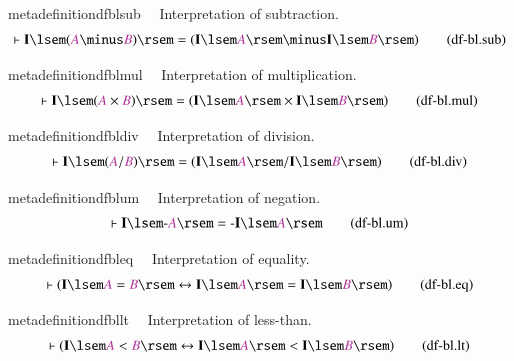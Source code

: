 \begin{restatable}{metadefinition}{dfblsub}~~ Interpretation of subtraction.
\begin{align}
\vdash \mathbf{I} \lsem ( \mc{A} \minus \mc{B} ) \rsem = ( \mathbf{I} \lsem
    \mc{A} \rsem \minus \mathbf{I} \lsem \mc{B} \rsem
    )\label{eq:df-bl.sub}\tag{df-bl.sub}
\end{align}
\end{restatable}

\begin{restatable}{metadefinition}{dfblmul}~~ Interpretation of multiplication.
\begin{align}
\vdash \mathbf{I} \lsem ( \mc{A} \times \mc{B} ) \rsem = ( \mathbf{I} \lsem
    \mc{A} \rsem \times \mathbf{I} \lsem \mc{B} \rsem
    )\label{eq:df-bl.mul}\tag{df-bl.mul}
\end{align}
\end{restatable}

\begin{restatable}{metadefinition}{dfbldiv}~~ Interpretation of division.
\begin{align}
\vdash \mathbf{I} \lsem ( \mc{A} / \mc{B} ) \rsem = ( \mathbf{I} \lsem \mc{A}
    \rsem / \mathbf{I} \lsem \mc{B} \rsem )\label{eq:df-bl.div}\tag{df-bl.div}
\end{align}
\end{restatable}

\begin{restatable}{metadefinition}{dfblum}~~ Interpretation of negation.
\begin{align}
\vdash \mathbf{I} \lsem \textrm{-} \mc{A} \rsem = \textrm{-} \mathbf{I} \lsem
    \mc{A} \rsem\label{eq:df-bl.um}\tag{df-bl.um}
\end{align}
\end{restatable}

\begin{restatable}{metadefinition}{dfbleq}~~ Interpretation of equality.
\begin{align}
\vdash ( \mathbf{I} \lsem \mc{A} = \mc{B} \rsem \leftrightarrow \mathbf{I}
    \lsem \mc{A} \rsem = \mathbf{I} \lsem \mc{B} \rsem
    )\label{eq:df-bl.eq}\tag{df-bl.eq}
\end{align}
\end{restatable}

\begin{restatable}{metadefinition}{dfbllt}~~ Interpretation of less-than.
\begin{align}
\vdash ( \mathbf{I} \lsem \mc{A} < \mc{B} \rsem \leftrightarrow \mathbf{I}
    \lsem \mc{A} \rsem < \mathbf{I} \lsem \mc{B} \rsem
    )\label{eq:df-bl.lt}\tag{df-bl.lt}
\end{align}
\end{restatable}

